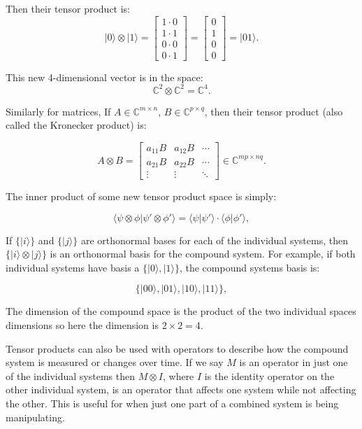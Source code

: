 \noindent Then their tensor product is:
\[
|0\rangle \otimes |1\rangle =
\begin{bmatrix}
1 \cdot 0 \\
1 \cdot 1 \\
0 \cdot 0 \\
0 \cdot 1
\end{bmatrix}
=
\begin{bmatrix}
0 \\
1 \\
0 \\
0
\end{bmatrix}
= |01\rangle.
\]

\noindent This new 4-dimensional vector is in the space:
\[
\mathbb{C}^2 \otimes \mathbb{C}^2 = \mathbb{C}^4.
\]

\noindent Similarly for matrices, If \( A \in \mathbb{C}^{m \times n} \), \( B \in \mathbb{C}^{p \times q} \), then their tensor product (also called the Kronecker product) is:

\[
A \otimes B =
\begin{bmatrix}
a_{11} B & a_{12} B & \cdots \\
a_{21} B & a_{22} B & \cdots \\
\vdots   & \vdots   & \ddots
\end{bmatrix}
\in \mathbb{C}^{mp \times nq}.
\]



\noindent The inner product of some new tensor product space is simply:

\[
\langle \psi \otimes \phi | \psi' \otimes \phi' \rangle = \langle \psi | \psi' \rangle \cdot \langle \phi | \phi' \rangle,
\]

\noindent If \( \{|i\rangle\} \) and \( \{|j\rangle\} \) are orthonormal bases for each of the individual systems, then \( \{|i\rangle \otimes |j\rangle\} \) is an orthonormal basis for the compound system. For example, if both individual systems have basis a \( \{|0\rangle, |1\rangle\} \), the compound systems basis is:

\[
\{|00\rangle, |01\rangle, |10\rangle, |11\rangle\},
\]

\noindent The dimension of the compound space is the product of the two individual spaces dimensions so here the dimension is \( 2 \times 2 = 4 \).

\noindent Tensor products can also be used with operators to describe how the compound system is measured or changes over time. If we say $M$ is an operator in just one of the individual systems then \( M \otimes I \), where \( I \) is the identity operator on the other individual system, is an operator that affects one system while not affecting the other. This is useful for when just one part of a combined system is being manipulating.

